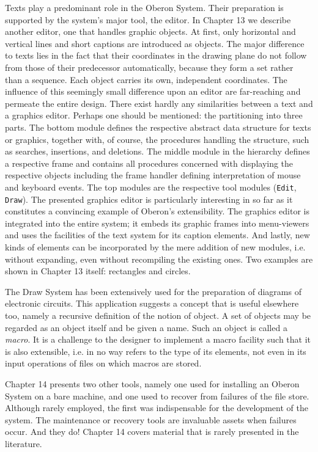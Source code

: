 Texts play a predominant role in the Oberon System. Their preparation
is supported by the system's major tool, the editor. In Chapter 13 we
describe another editor, one that handles graphic objects. At first,
only horizontal and vertical lines and short captions are introduced
as objects. The major difference to texts lies in the fact that their
coordinates in the drawing plane do not follow from those of their
predecessor automatically, because they form a set rather than a
sequence. Each object carries its own, independent coordinates. The
influence of this seemingly small difference upon an editor are
far-reaching and permeate the entire design. There exist hardly any
similarities between a text and a graphics editor. Perhaps one should
be mentioned: the partitioning into three parts. The bottom module
defines the respective abstract data structure for texts or graphics,
together with, of course, the procedures handling the structure, such
as searches, insertions, and deletions. The middle module in the
hierarchy defines a respective frame and contains all procedures
concerned with displaying the respective objects including the frame
handler defining interpretation of mouse and keyboard events. The top
modules are the respective tool modules ({\tt Edit\/}, {\tt Draw\/}). The presented
graphics editor is particularly interesting in so far as it
constitutes a convincing example of Oberon's extensibility. The
graphics editor is integrated into the entire system; it embeds its
graphic frames into menu-viewers and uses the facilities of the text
system for its caption elements. And lastly, new kinds of elements can
be incorporated by the mere addition of new modules, i.e. without
expanding, even without recompiling the existing ones. Two examples
are shown in Chapter 13 itself: rectangles and circles.

The Draw System has been extensively used for the preparation of
diagrams of electronic circuits. This application suggests a concept
that is useful elsewhere too, namely a recursive definition of the
notion of object. A set of objects may be regarded as an object itself
and be given a name. Such an object is called a {\it macro\/}. It is a
challenge to the designer to implement a macro facility such that it
is also extensible, i.e. in no way refers to the type of its elements,
not even in its input operations of files on which macros are stored.

Chapter 14 presents two other tools, namely one used for installing an
Oberon System on a bare machine, and one used to recover from failures
of the file store. Although rarely employed, the first was
indispensable for the development of the system. The maintenance or
recovery tools are invaluable assets when failures occur. And they do!
Chapter 14 covers material that is rarely presented in the literature.

